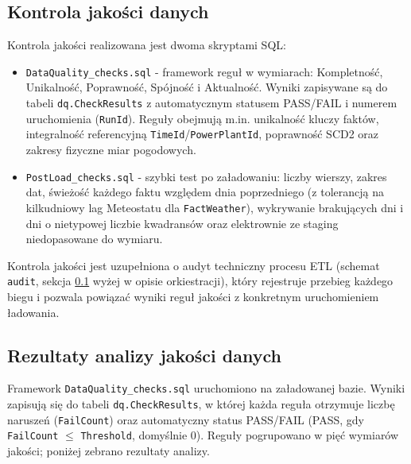 \documentclass[12pt]{article}
\begin{document}
	\subsection{Kontrola jakości danych}
	\label{sec:dq}
	Kontrola jakości realizowana jest dwoma skryptami SQL:
	\begin{itemize}
		\item \texttt{DataQuality\_checks.sql} - framework reguł w wymiarach: Kompletność, Unikalność, Poprawność, Spójność i Aktualność. Wyniki zapisywane są do tabeli \texttt{dq.CheckResults} z automatycznym statusem PASS/FAIL i numerem uruchomienia (\texttt{RunId}). Reguły obejmują m.in. unikalność kluczy faktów, integralność referencyjną \texttt{TimeId}/\texttt{PowerPlantId}, poprawność SCD2 oraz zakresy fizyczne miar pogodowych.
		\item \texttt{PostLoad\_checks.sql} - szybki test po załadowaniu: liczby wierszy, zakres dat, świeżość każdego faktu względem dnia poprzedniego (z tolerancją na kilkudniowy lag Meteostatu dla \texttt{FactWeather}), wykrywanie brakujących dni i dni o nietypowej liczbie kwadransów oraz elektrownie ze staging niedopasowane do wymiaru.
	\end{itemize}
	Kontrola jakości jest uzupełniona o audyt techniczny procesu ETL (schemat \texttt{audit}, sekcja \ref{sec:dq} wyżej w opisie orkiestracji), który rejestruje przebieg każdego biegu i pozwala powiązać wyniki reguł jakości z konkretnym uruchomieniem ładowania.

	\subsection{Rezultaty analizy jakości danych}
	\label{sec:dqresults}

	Framework \texttt{DataQuality\_checks.sql} uruchomiono na załadowanej bazie. Wyniki zapisują się do tabeli \texttt{dq.CheckResults}, w której każda reguła otrzymuje liczbę naruszeń (\texttt{FailCount}) oraz automatyczny status PASS/FAIL (PASS, gdy \texttt{FailCount} $\le$ \texttt{Threshold}, domyślnie 0). Reguły pogrupowano w pięć wymiarów jakości; poniżej zebrano rezultaty analizy.
\end{document}
